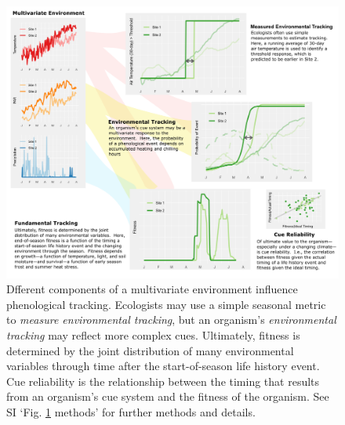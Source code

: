 \documentclass[11pt,letterpaper]{article}
\begin{document}
\begin{figure}[h!]
\centering
\includegraphics[width=1\textwidth]{..//..//..//..//R/graphs/conceptual/Fig3_pretty.png}
\caption{Dfferent components of a multivariate environment influence phenological tracking.  Ecologists may use a simple seasonal metric to \emph{measure environmental tracking}, but an organism's \emph{environmental tracking} may reflect more complex cues.  Ultimately, fitness is determined by the joint distribution of many environmental variables through time after the start-of-season life history event.  Cue reliability is the relationship between the timing that results from an organism's cue system and the fitness of the organism.  See SI `Fig. \ref{fig:defineET} methods' for further methods and details.} 
 \label{fig:defineET}
\end{figure}
\end{document}
